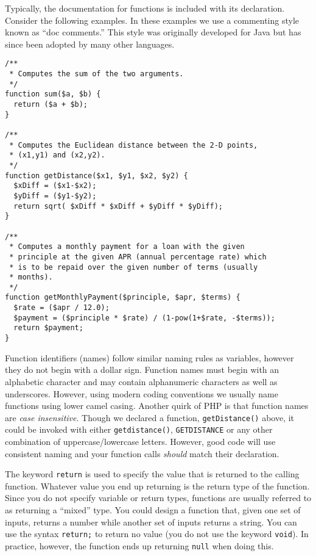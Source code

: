 Typically, the documentation for functions is included with its
declaration.  Consider the following examples.  In these examples 
we use a commenting style known as ``doc comments.'' This 
style was originally developed for Java but has since been 
adopted by many other languages.

\begin{verbatim}
/**
 * Computes the sum of the two arguments.
 */
function sum($a, $b) {
  return ($a + $b);
}

/**
 * Computes the Euclidean distance between the 2-D points, 
 * (x1,y1) and (x2,y2).
 */
function getDistance($x1, $y1, $x2, $y2) {
  $xDiff = ($x1-$x2);
  $yDiff = ($y1-$y2);
  return sqrt( $xDiff * $xDiff + $yDiff * $yDiff);
}

/**
 * Computes a monthly payment for a loan with the given
 * principle at the given APR (annual percentage rate) which
 * is to be repaid over the given number of terms (usually
 * months).
 */
function getMonthlyPayment($principle, $apr, $terms) {
  $rate = ($apr / 12.0);
  $payment = ($principle * $rate) / (1-pow(1+$rate, -$terms));
  return $payment;
}
\end{verbatim}

Function identifiers (names) follow similar naming rules as 
variables, however they do not begin with a dollar sign.  
Function names must begin with an alphabetic character 
and may contain alphanumeric characters as well as 
underscores.  However, using modern coding conventions 
we usually name functions using lower camel casing.  Another
quirk of PHP is that function names are \emph{case insensitive}.
Though we declared a function, \texttt{getDistance()}
above, it could be invoked with either \texttt{getdistance()}, 
\texttt{GETDISTANCE} or any other combination of
uppercase/lowercase letters.  However, good code will use consistent
naming and your function calls \emph{should} match their
declaration.

The keyword \texttt{return} is used to specify the value
that is returned to the calling function.  Whatever value you end
up returning is the return type of the function.  Since you do not
specify variable or return types, functions are usually referred
to as returning a ``mixed'' type.  You could design a function that,
given one set of inputs, returns a number while another set of
inputs returns a string.  You can use the syntax 
\texttt{return;} to return no
value (you do not use the keyword \texttt{void}).  
In practice, however, the function ends up returning 
\texttt{null} when doing this.  

